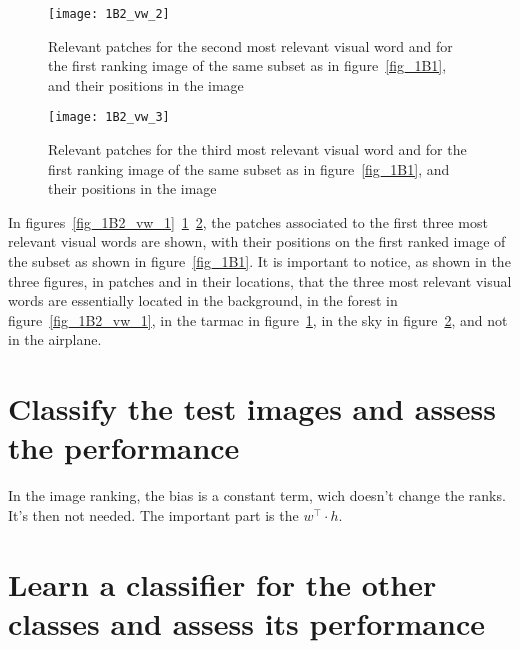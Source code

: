 \documentclass{article}
\begin{document}
\begin{figure}[ht!]
	\centering
	\texttt{[image: 1B2\_vw\_2]}
	\caption{Relevant patches for the second most relevant visual word and for the first ranking image of the same subset as in figure~\ref{fig_1B1}, and their positions in the image}
	\label{fig_1B2_vw_2}
\end{figure}

\begin{figure}[ht!]
	\centering
	\texttt{[image: 1B2\_vw\_3]}
	\caption{Relevant patches for the third most relevant visual word and for the first ranking image of the same subset as in figure~\ref{fig_1B1}, and their positions in the image}
	\label{fig_1B2_vw_3}
\end{figure}

In figures~\ref{fig_1B2_vw_1}~\ref{fig_1B2_vw_2}~\ref{fig_1B2_vw_3}, the patches associated to the first three most relevant visual words are shown, with their positions on the first ranked image of the subset as shown in figure~\ref{fig_1B1}. It is important to notice, as shown in the three figures, in patches and in their locations, that the three most relevant visual words are essentially located in the background, in the forest in figure~\ref{fig_1B2_vw_1}, in the tarmac in figure~\ref{fig_1B2_vw_2}, in the sky in figure~\ref{fig_1B2_vw_3}, and not in the airplane.

\clearpage

\section{Classify the test images and assess the performance}


In the image ranking, the bias is a constant term, wich doesn't change the ranks. It's then not needed. The important part is the \( w^{\intercal} \cdot h\).

\section{Learn a classifier for the other classes and assess its performance}

\end{document}
